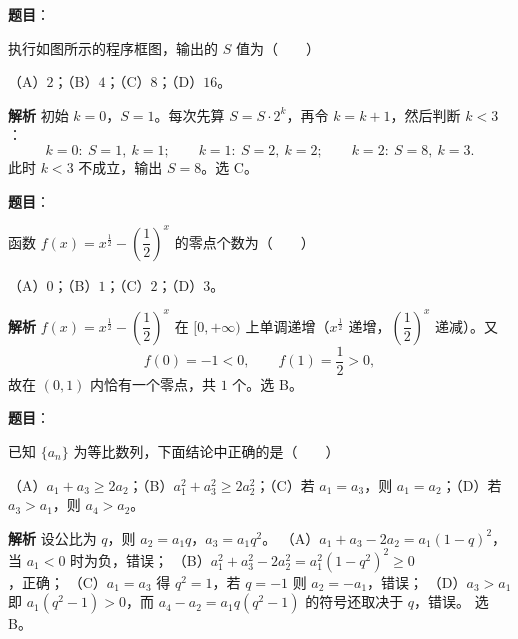 \begin{answer}

\textbf{题目}：

执行如图所示的程序框图，输出的 $S$ 值为\mbox{（　　）}
\nopagebreak[4]
\begin{center}\end{center}
\nopagebreak[4]
（A）$2$；（B）$4$；（C）$8$；（D）$16$。

\textbf{解析}
初始 $k=0$，$S=1$。每次先算 $S=S\cdot2^k$，再令 $k=k+1$，然后判断 $k<3$：
\nopagebreak[4]
\[k=0:\ S=1,\ k=1;\qquad k=1:\ S=2,\ k=2;\qquad k=2:\ S=8,\ k=3.\]
此时 $k<3$ 不成立，输出 $S=8$。选 C。


\end{answer}
\begin{answer}

\textbf{题目}：

函数 $f(x)=x^{\frac12}-\left(\dfrac12\right)^x$ 的零点个数为\mbox{（　　）}

（A）$0$；（B）$1$；（C）$2$；（D）$3$。

\textbf{解析}
$f(x)=x^{\frac12}-\left(\dfrac12\right)^x$ 在 $[0,+\infty)$ 上单调递增（$x^{\frac12}$ 递增，$\left(\dfrac12\right)^x$ 递减）。又
\nopagebreak[4]
\[f(0)=-1<0,\qquad f(1)=\frac12>0,\]
故在 $(0,1)$ 内恰有一个零点，共 $1$ 个。选 B。


\end{answer}
\begin{answer}

\textbf{题目}：

已知 $\{a_n\}$ 为等比数列，下面结论中正确的是\mbox{（　　）}

（A）$a_1+a_3\geqslant2a_2$；（B）$a_1^2+a_3^2\geqslant2a_2^2$；（C）若 $a_1=a_3$，则 $a_1=a_2$；（D）若 $a_3>a_1$，则 $a_4>a_2$。

\textbf{解析}
设公比为 $q$，则 $a_2=a_1q$，$a_3=a_1q^2$。
（A）$a_1+a_3-2a_2=a_1(1-q)^2$，当 $a_1<0$ 时为负，错误；
（B）$a_1^2+a_3^2-2a_2^2=a_1^2(1-q^2)^2\geqslant0$，正确；
（C）$a_1=a_3$ 得 $q^2=1$，若 $q=-1$ 则 $a_2=-a_1$，错误；
（D）$a_3>a_1$ 即 $a_1(q^2-1)>0$，而 $a_4-a_2=a_1q(q^2-1)$ 的符号还取决于 $q$，错误。
选 B。


\end{answer}
